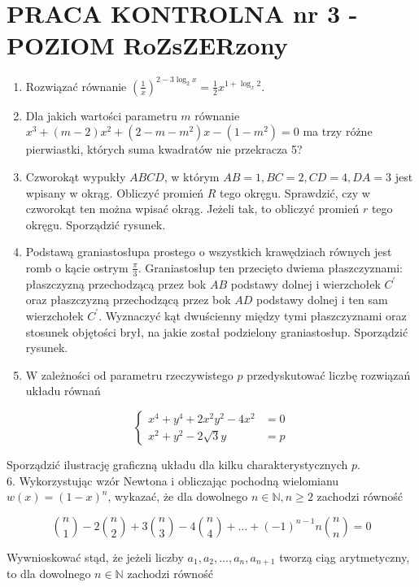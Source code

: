 \documentclass[10pt]{article}
\begin{document}
\section*{PRACA KONTROLNA nr 3 - POZIOM RoZsZERzony}
\begin{enumerate}
  \item Rozwiązać równanie $\left(\frac{1}{x}\right)^{2-3 \log _{2} x}=\frac{1}{2} x^{1+\log _{x} 2}$.
  \item Dla jakich wartości parametru $m$ równanie $x^{3}+(m-2) x^{2}+\left(2-m-m^{2}\right) x-\left(1-m^{2}\right)=0$ ma trzy różne pierwiastki, których suma kwadratów nie przekracza 5?
  \item Czworokąt wypukły $A B C D$, w którym $A B=1, B C=2, C D=4, D A=3$ jest wpisany w okrąg. Obliczyć promień $R$ tego okręgu. Sprawdzić, czy w czworokąt ten można wpisać okrąg. Jeżeli tak, to obliczyć promień $r$ tego okręgu. Sporządzić rysunek.
  \item Podstawą graniastosłupa prostego o wszystkich krawędziach równych jest romb o kącie ostrym $\frac{\pi}{3}$. Graniastosłup ten przecięto dwiema płaszczyznami: płaszczyzną przechodzącą przez bok $A B$ podstawy dolnej i wierzchołek $C^{\prime}$ oraz płaszczyzną przechodzącą przez bok $A D$ podstawy dolnej i ten sam wierzchołek $C^{\prime}$. Wyznaczyć kąt dwuścienny między tymi płaszczyznami oraz stosunek objętości brył, na jakie został podzielony graniastosłup. Sporządzić rysunek.
  \item W zależności od parametru rzeczywistego $p$ przedyskutować liczbę rozwiązań układu równań
\end{enumerate}

$$
\begin{cases}x^{4}+y^{4}+2 x^{2} y^{2}-4 x^{2} & =0 \\ x^{2}+y^{2}-2 \sqrt{3} y & =p\end{cases}
$$

Sporządzić ilustrację graficzną układu dla kilku charakterystycznych $p$.\\
6. Wykorzystując wzór Newtona i obliczając pochodną wielomianu $w(x)=(1-x)^{n}$, wykazać, że dla dowolnego $n \in \mathbb{N}, n \geqslant 2$ zachodzi równość

$$
\binom{n}{1}-2\binom{n}{2}+3\binom{n}{3}-4\binom{n}{4}+\ldots+(-1)^{n-1} n\binom{n}{n}=0
$$

Wywnioskować stąd, że jeżeli liczby $a_{1}, a_{2}, \ldots, a_{n}, a_{n+1}$ tworzą ciąg arytmetyczny, to dla dowolnego $n \in \mathbb{N}$ zachodzi równość
\end{document}
